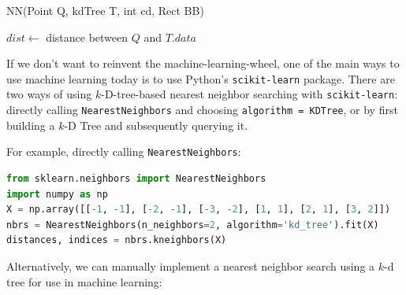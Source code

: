 \documentclass{article}
\begin{document}
            \begin{function}
                \caption{NN(Point Q, kdTree T, int cd, Rect BB)}
                \DontPrintSemicolon

                \KwOut{}


                $dist \gets$ distance between $Q$ and $T.data$\;

            \end{function}

            If we don't want to reinvent the machine-learning-wheel, one of the main ways to use machine learning today is to use Python's \texttt{scikit-learn} package.  There are two ways of using $k$-D-tree-based nearest neighbor searching with \texttt{scikit-learn}\cite{sklearn_api}: directly calling \texttt{NearestNeighbors} and choosing \texttt{algorithm = KDTree}, or by first building a $k$-D Tree and subsequently querying it.

            For example, directly calling \texttt{NearestNeighbors}: 

            \begin{lstlisting}[language = Python, caption = \texttt{NearestNeighbors}]
from sklearn.neighbors import NearestNeighbors
import numpy as np
X = np.array([[-1, -1], [-2, -1], [-3, -2], [1, 1], [2, 1], [3, 2]])
nbrs = NearestNeighbors(n_neighbors=2, algorithm='kd_tree').fit(X)
distances, indices = nbrs.kneighbors(X)
            \end{lstlisting}

            Alternatively, we can manually implement a nearest neighbor search using a $k$-d tree for use in machine learning:
\end{document}
